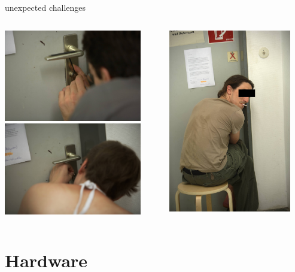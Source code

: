 \documentclass{beamer}
\begin{document}
\begin{frame}{unexpected challenges}
  \begin{columns}
    \begin{column}{6cm}
        \includegraphics[height=4cm]{bilder/ipick.jpg}\\
        \includegraphics[height=4cm]{bilder/lpick.jpg}
    \end{column}
    \begin{column}{6cm}
        \includegraphics[height=8cm]{bilder/apick.jpg}
    \end{column}
  \end{columns}
\end{frame}
\section{Hardware}
\end{document}
